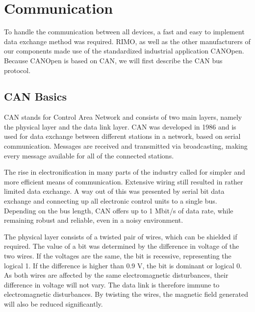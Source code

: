 
\chapter{Communication}
\label{chp:Communication}

To handle the communication between all devices, a fast and easy to implement data exchange method was required. RIMO, as well as the other manufacturers of our components made use of the standardized industrial application CANOpen. Because CANOpen is based on CAN, we will first describe the CAN bus protocol.

\section{CAN Basics}


CAN stands for Control Area Network and consists of two main layers, namely the physical layer and the data link layer. CAN was developed in 1986 and is used for data exchange between different stations in a network, based on serial communication. Messages are received and transmitted via broadcasting, making every message available for all of the connected stations. 

The rise in electronification in many parts of the industry called for simpler and more efficient means of communication. Extensive wiring still resulted in rather limited data exchange. A way out of this was presented by serial bit data exchange and connecting up all electronic control units to a single bus. Depending on the bus length, CAN offers up to 1 Mbit/s of data rate, while remaining robust and reliable, even in a noisy environment.

The physical layer consists of a twisted pair of wires, which can be shielded if required. The value of a bit was determined by the difference in voltage of the two wires. If the voltages are the same, the bit is recessive, representing the logical 1. If the difference is higher than 0.9 V, the bit is dominant or logical 0. As both wires are affected by the same electromagnetic disturbances, their difference in voltage will not vary. The data link is therefore immune to electromagnetic disturbances. By twisting the wires, the magnetic field generated will also be reduced significantly.


